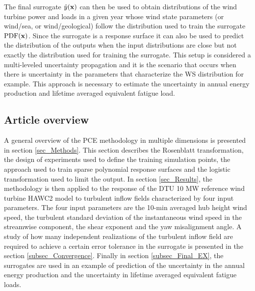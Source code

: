 \documentclass[preprint,12pt]{elsarticle}
\begin{document}


The final surrogate $\hat{y}(\mathbf{x})$ can then be used to obtain distributions of the wind turbine power and loads in a given year whose wind state parameters (or wind/sea, or wind/geological) follow the distribution used to train the surrogate $\mathrm{PDF}(\mathbf{x})$. Since the surrogate is a response surface it can also be used to predict the distribution of the outputs when the input distributions are close but not exactly the distribution used for training the surrogate. This setup is considered a multi-leveled uncertainty propagation and it is the scenario that occurs when there is uncertainty in the parameters that characterize the WS distribution for example. This approach is necessary to estimate the uncertainty in annual energy production and lifetime averaged equivalent fatigue load.

\subsection{Article overview}

A general overview of the PCE methodology in multiple dimensions is presented in section \ref{sec_Methods}. This section describes the Rosenblatt transformation, the design of experiments used to define the training simulation points, the approach used to train sparse polynomial response surfaces and the logistic transformation used to limit the output. In section \ref{sec_Results}, the methodology is then applied to the response of the DTU 10 MW reference wind turbine HAWC2 model \cite{bak2012light} to turbulent inflow fields characterized by four input parameters. The four input parameters are the 10-min averaged hub height wind speed, the turbulent standard deviation of the instantaneous wind speed in the streamwise component, the shear exponent and the yaw misalignment angle. A study of how many independent realizations of the turbulent inflow field are required to achieve a certain error tolerance in the surrogate is presented in the section \ref{subsec_Convergence}. Finally in section \ref{subsec_Final_EX}, the surrogates are used in an example of prediction of the uncertainty in the annual energy production and the uncertainty in lifetime averaged equivalent fatigue loads.
\end{document}
